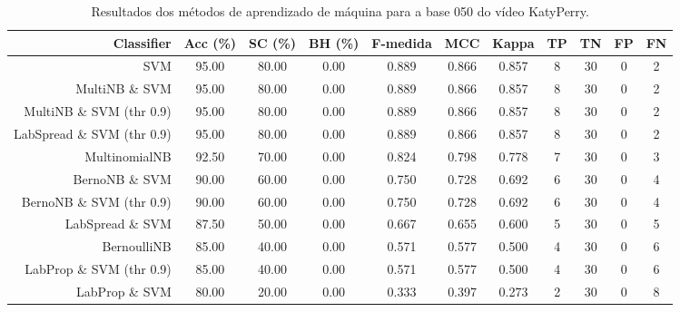 \begin{table}[!htb]
\centering
\caption{Resultados dos métodos de aprendizado de máquina para a base 050 do vídeo KatyPerry.}
\label{tab:KatyPerry-050}
\begin{tabular}{r|c|c|c|c|c|c|c|c|c|c}
\hline\hline
Classifier & Acc (\%) & SC (\%) & BH (\%) & F-medida & MCC & Kappa & TP & TN & FP & FN \\ \hline
SVM & 95.00 & 80.00 & 0.00 & 0.889 & 0.866 & 0.857 & 8 & 30 & 0 & 2 \\ 
MultiNB \& SVM & 95.00 & 80.00 & 0.00 & 0.889 & 0.866 & 0.857 & 8 & 30 & 0 & 2 \\ 
MultiNB \& SVM (thr 0.9) & 95.00 & 80.00 & 0.00 & 0.889 & 0.866 & 0.857 & 8 & 30 & 0 & 2 \\ 
LabSpread \& SVM (thr 0.9) & 95.00 & 80.00 & 0.00 & 0.889 & 0.866 & 0.857 & 8 & 30 & 0 & 2 \\ 
MultinomialNB & 92.50 & 70.00 & 0.00 & 0.824 & 0.798 & 0.778 & 7 & 30 & 0 & 3 \\ 
BernoNB \& SVM & 90.00 & 60.00 & 0.00 & 0.750 & 0.728 & 0.692 & 6 & 30 & 0 & 4 \\ 
BernoNB \& SVM (thr 0.9) & 90.00 & 60.00 & 0.00 & 0.750 & 0.728 & 0.692 & 6 & 30 & 0 & 4 \\ 
LabSpread \& SVM & 87.50 & 50.00 & 0.00 & 0.667 & 0.655 & 0.600 & 5 & 30 & 0 & 5 \\ 
BernoulliNB & 85.00 & 40.00 & 0.00 & 0.571 & 0.577 & 0.500 & 4 & 30 & 0 & 6 \\ 
LabProp \& SVM (thr 0.9) & 85.00 & 40.00 & 0.00 & 0.571 & 0.577 & 0.500 & 4 & 30 & 0 & 6 \\ 
LabProp \& SVM & 80.00 & 20.00 & 0.00 & 0.333 & 0.397 & 0.273 & 2 & 30 & 0 & 8 \\ 
\hline\hline
\end{tabular}
\end{table}
